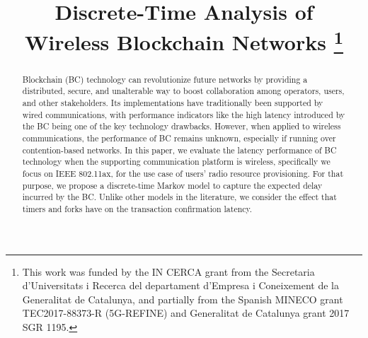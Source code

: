 \documentclass[conference]{IEEEtran}
\theoremstyle{definition}
\begin{document}
\title{Discrete-Time Analysis of \\Wireless Blockchain Networks
\thanks{This work was funded by the IN CERCA grant from the Secretaria d'Universitats i Recerca del departament d'Empresa i Coneixement de la
Generalitat de Catalunya, and partially from the Spanish MINECO grant TEC2017-88373-R (5G-REFINE) and Generalitat de Catalunya grant 2017 SGR 1195.}
}


\author{
\and
{}
}


\maketitle

\begin{abstract}
Blockchain (BC) technology can revolutionize future networks by providing a distributed, secure, and unalterable way to boost collaboration among operators, users, and other stakeholders. Its implementations have traditionally been supported by wired communications, with performance indicators like the high latency introduced by the BC being one of the key technology drawbacks. However, when applied to wireless communications, the performance of BC remains unknown, especially if running over contention-based networks. In this paper, we evaluate the latency performance of BC technology when the supporting communication platform is wireless, specifically we focus on IEEE 802.11ax, for the use case of users' radio resource provisioning. For that purpose, we propose a discrete-time Markov model to capture the expected delay incurred by the BC. Unlike other models in the literature, we consider the effect that timers and forks have on the transaction confirmation latency.
\end{abstract}
\end{document}
